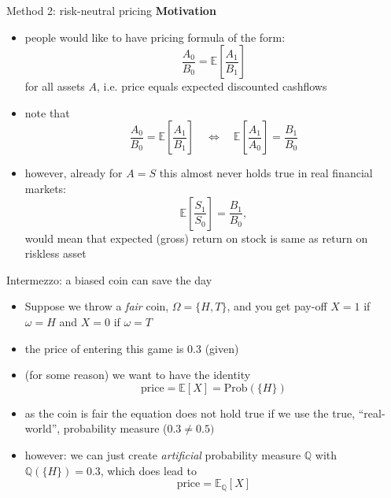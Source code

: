 \documentclass[pdf, handout]{beamer}
\begin{document}
\begin{frame}{Method 2: risk-neutral pricing}
\textbf{Motivation}
\begin{itemize}
\item
people would like to have pricing formula of the form:
\[
\frac{A_0}{B_0} = \mathbb{E}\left[ \frac{A_1}{B_1} \right]  
\]
for all assets $A$, i.e. price equals expected discounted cashflows
\item note that
\[
\frac{A_0}{B_0} = \mathbb{E}\left[ \frac{A_1}{B_1} \right] \quad \Longleftrightarrow\quad
 \mathbb{E}\left[ \frac{A_1}{A_0} \right] =\frac{B_1}{B_0}
\]
\item however, already for $A=S$ this almost never holds true in real
financial markets:
\[
 \mathbb{E}\left[ \frac{S_1}{S_0} \right] =\frac{B_1}{B_0},
\]
would mean that expected (gross) return on stock is same as
return on riskless asset
\end{itemize}
\end{frame}

\begin{frame}{Intermezzo:  a biased coin can save the day} 
\begin{itemize}
\item
Suppose we throw a \emph{fair} coin, $\Omega=\{H,T\}$, and you get
pay-off $X=1$ if $\omega=H$ and $X=0$ if $\omega=T$
\item the price of entering this game is 0.3 (given)
\item (for some reason) we want to have the identity
\[
\text{price} = \mathbb{E}[ X] = \text{Prob}(\{H\})
\]
\item as the coin is fair the equation does not hold true if we use the true, ``real-world'',  probability measure ($0.3\neq 0.5)$
\item however: we can just create \emph{artificial} probability measure
$\mathbb{Q}$ with $\mathbb{Q}(\{H\})=0.3$, which does lead to
\[
\text{price} = \mathbb{E}_{\mathbb{Q}}[X]
\]
\end{itemize}
\end{frame}
\end{document}
